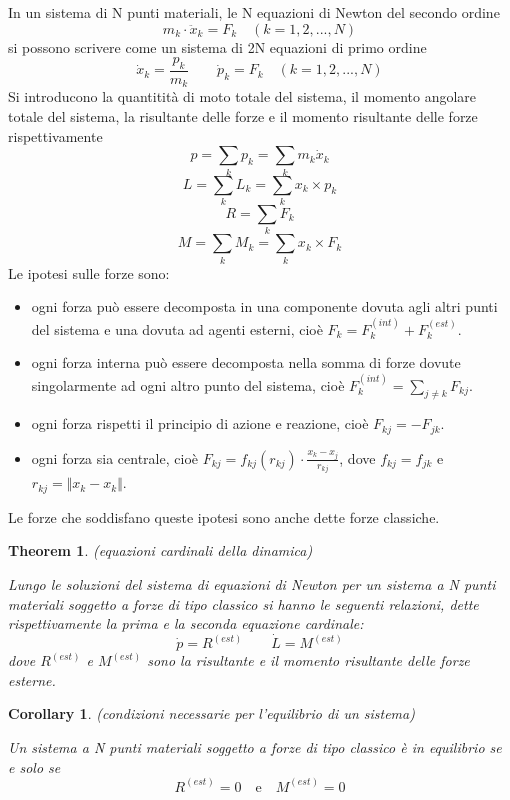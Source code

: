 \documentclass{article}
\newtheorem{theorem}{Theorem}[section]
\newtheorem{corollary}{Corollary}[theorem]
\begin{document}
            In un sistema di N punti materiali, le N equazioni di Newton del secondo ordine \[ m_k \cdot \ddot{x}_k = F_k \quad (k = 1, 2, ..., N) \] si possono scrivere come
            un sistema di 2N equazioni di primo ordine \[ \dot{x}_k = \frac{p_k}{m_k} \quad \quad \dot{p}_k = F_k \quad (k = 1, 2, ..., N) \]
            Si introducono la quantitità di moto totale del sistema, il momento angolare totale del sistema, la risultante delle forze e il momento risultante delle forze
            rispettivamente \[ p = \sum_k p_k = \sum_k m_k \dot{x}_k \] \[ L = \sum_k L_k = \sum_k x_k \times p_k \] \[ R = \sum_k F_k \] \[ M =  \sum_k M_k = \sum_k x_k \times F_k \]
            Le ipotesi sulle forze sono:
            \begin{itemize} 
                \item ogni forza può essere decomposta in una componente dovuta agli altri punti del sistema e una dovuta ad agenti esterni, cioè $F_k = F_k^{(int)} + F_k^{(est)}$.
                \item ogni forza interna può essere decomposta nella somma di forze dovute singolarmente ad ogni altro punto del sistema, cioè $F_k^{(int)} = \sum_{j \neq k} F_{kj}$.
                \item ogni forza rispetti il principio di azione e reazione, cioè $F_{kj} = - F_{jk}$.
                \item ogni forza sia centrale, cioè $F_{kj} = f_{kj}(r_{kj}) \cdot \frac{x_k - x_j}{r_{kj}}$, dove $f_{kj} = f_{jk}$ e $r_{kj} = \Vert x_k - x_k \Vert$.
            \end{itemize}
            Le forze che soddisfano queste ipotesi sono anche dette forze classiche. \\

            \begin{theorem}(equazioni cardinali della dinamica)
                \label{thm:equazioni cardinali}

                Lungo le soluzioni del sistema di equazioni di Newton per un sistema a N punti materiali soggetto a forze di tipo classico si hanno le seguenti relazioni,
                dette rispettivamente la prima e la seconda equazione cardinale: \[ \dot{p} = R^{(est)} \quad \quad \dot{L} = M^{(est)} \]
                dove $R^{(est)}$ e $M^{(est)}$ sono la risultante e il momento risultante delle forze esterne.

            \end{theorem}
            \begin{corollary}(condizioni necessarie per l'equilibrio di un sistema)
                \label{cor:equilibrio di un sistema}

                Un sistema a N punti materiali soggetto a forze di tipo classico è in equilibrio se e solo se \[ R^{(est)} = 0 \quad \text{e} \quad M^{(est)} = 0 \]

            \end{corollary}
\end{document}
